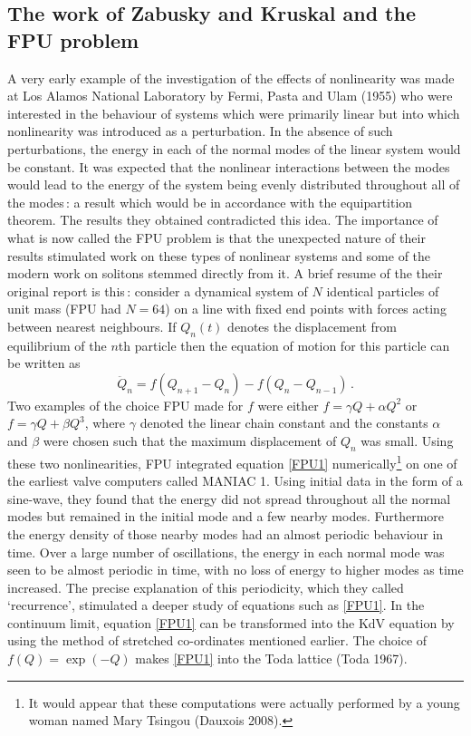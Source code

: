 \documentclass[11pt]{article}
\newcommand{\bel}{\begin{equation}\label}
\newcommand{\ee}{\end{equation}}
\begin{document}
\subsection{\small The work of Zabusky and Kruskal and the FPU problem}\label{ZKFPU}

A very early example of the investigation of the effects of nonlinearity was made at Los Alamos National Laboratory by Fermi, Pasta and Ulam (1955) who were interested in the behaviour of systems which were primarily linear but into which nonlinearity was introduced as a perturbation. In the absence of such perturbations, the energy in each of the normal modes of the linear system would be constant. It was expected that the nonlinear interactions between the modes would lead to the energy of the system being evenly distributed throughout all of the modes\,: a result which would be in accordance with the equipartition theorem. The results they obtained contradicted this idea. The importance of what is now called the FPU problem is that the unexpected nature of their results stimulated work on these types of nonlinear systems and some of the modern work on solitons stemmed directly from it. A brief resume of the their original report is this\,: consider a dynamical system of $N$ identical particles of unit mass (FPU had $N =64$) on a line with fixed end points with forces acting between nearest neighbours. If 
$Q_{n}(t)$ denotes the displacement from equilibrium of the $n$th particle then the equation of motion for this particle can 
be written as
\bel{FPU1}
\ddot{Q}_{n} = f(Q_{n+1} - Q_{n}) - f(Q_{n} - Q_{n-1})\,.
\ee
Two examples of the choice FPU made for $f$ were either $f = \gamma Q + \alpha Q^{2}$ or $f = \gamma Q + \beta Q^{3}$, where 
$\gamma$ denoted the linear chain constant and the constants $\alpha$ and $\beta$ were chosen such that the maximum displacement of $Q_{n}$ was small. Using these two nonlinearities, FPU integrated equation \eqref{FPU1} numerically\footnote{It would appear that these computations were actually performed by a young woman named Mary Tsingou (Dauxois 2008).} on one of the earliest valve computers called MANIAC 1. Using initial data in the form of a sine-wave, they found that the energy did not spread throughout all the normal modes but remained in the initial mode and a few nearby modes. Furthermore the energy density of 
those nearby modes had an almost periodic behaviour in time. Over a large number of oscillations, the energy in each normal 
mode was seen to be almost periodic in time, with no loss of energy to higher modes as time increased. The precise explanation of this periodicity, which they called `recurrence', stimulated a deeper study of equations such as \eqref{FPU1}. In the continuum limit, equation \eqref{FPU1} can be transformed into the KdV equation by using the method of stretched co-ordinates mentioned earlier. The choice of $f (Q) = \exp (-Q)$ makes \eqref{FPU1} into the Toda lattice (Toda 1967). 
\end{document}

